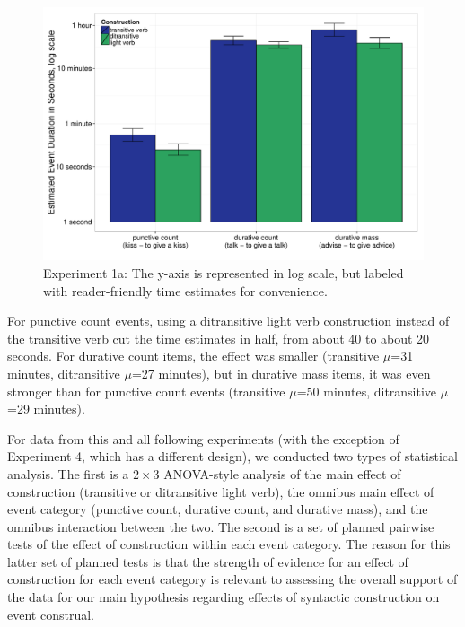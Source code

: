 \documentclass[preprint,12pt,authoryear]{elsarticle}
\begin{document}
\begin{figure}[ht!]
\centering
\includegraphics[width=\textwidth]{./Figures/Exp1a_AllEventsBar.pdf}
\caption{Experiment 1a: The y-axis is represented in log scale, but labeled with reader-friendly time estimates for convenience. }
\label{fig_resOE}
\end{figure}

For punctive count events, using a ditransitive light verb construction instead of the transitive verb cut the time estimates in half, from about 40 to about 20 seconds. For durative count items, the effect was smaller (transitive $\mu$=31 minutes, ditransitive $\mu$=27 minutes), but in durative mass items, it was even stronger than for punctive count events (transitive $\mu$=50 minutes, ditransitive $\mu$=29 minutes).

For data from this and all following experiments (with the exception of Experiment 4, which has a different design), we conducted two types of statistical analysis. The first is a $2 \times 3$ ANOVA-style analysis of the main effect of construction (transitive or ditransitive light verb), the omnibus main effect of event category (punctive count, durative count, and durative mass), and the omnibus interaction between the two. The second is a set of planned pairwise tests of the effect of construction within each event category.  The reason for this latter set of planned tests is that the strength of evidence for an effect of construction for each event category is relevant to assessing the overall support of the data for our main hypothesis regarding effects of syntactic construction on event construal.  
\end{document}
